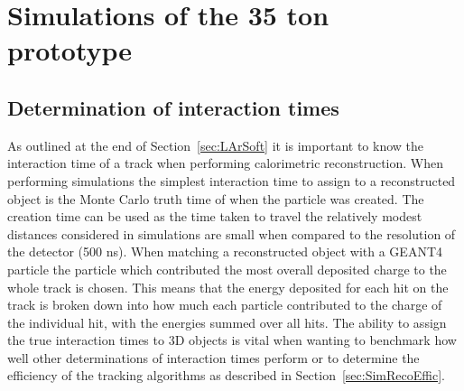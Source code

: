 

\chapter{Simulations of the 35 ton prototype}  %

\graphicspath{ {35tonSimulation/Figs/PDF/} {35tonSimulation/Figs/Vector/} } %

\section{Determination of interaction times} \label{sec:SimInteractionTimes} %
As outlined at the end of Section~\ref{sec:LArSoft} it is important to know the interaction time of a track when performing calorimetric reconstruction. When performing simulations the simplest interaction time to assign to a reconstructed object is the Monte Carlo truth time of when the particle was created. The creation time can be used as the time taken to travel the relatively modest distances considered in simulations are small when compared to the resolution of the detector (500 ns). When matching a reconstructed object with a GEANT4 particle the particle which contributed the most overall deposited charge to the whole track is chosen. This means that the energy deposited for each hit on the track is broken down into how much each particle contributed to the charge of the individual hit, with the energies summed over all hits. The ability to assign the true interaction times to 3D objects is vital when wanting to benchmark how well other determinations of interaction times perform or to determine the efficiency of the tracking algorithms as described in Section~\ref{sec:SimRecoEffic}. \\

